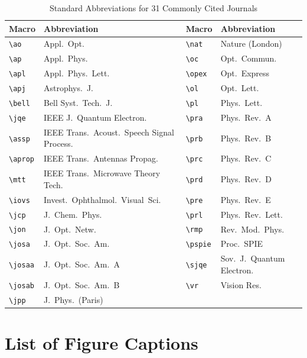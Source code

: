 \documentclass[letterpaper,12pt]{article}   %
\begin{document}
\newpage

\begin{table}[h]
{\bf \caption{Standard Abbreviations for 31 Commonly Cited
Journals}}\begin{center}
\begin{tabular}{lp{2.3in}lp{1.5in}}\hline
Macro & Abbreviation & Macro & Abbreviation \\ \hline
\verb+\ao+ & Appl.\  Opt.\  & \verb+\nat+ & Nature (London)   \\
\verb+\ap+ & Appl.\  Phys.\  & \verb+\oc+ & Opt.\ Commun.\   \\
\verb+\apl+ & Appl.\ Phys.\ Lett.\
  & \verb+\opex+ & Opt.\ Express   \\
\verb+\apj+ & Astrophys.\ J.\  & \verb+\ol+ & Opt.\ Lett.\   \\
\verb+\bell+ & Bell Syst.\ Tech.\ J.\
  & \verb+\pl+ & Phys.\ Lett.\   \\
\verb+\jqe+ & IEEE J.\ Quantum Electron.\
  & \verb+\pra+ & Phys.\ Rev.\ A   \\
\verb+\assp+ & IEEE Trans.\ Acoust.\ Speech Signal Process.\
  & \verb+\prb+ & Phys.\ Rev.\ B   \\
\verb+\aprop+ & IEEE Trans.\  Antennas Propag.\
  & \verb+\prc+ & Phys.\ Rev.\ C   \\
\verb+\mtt+ & IEEE Trans.\ Microwave Theory Tech.\
  & \verb+\prd+ & Phys.\ Rev.\ D   \\
\verb+\iovs+ & Invest.\ Ophthalmol.\ Visual\ Sci.\
  & \verb+\pre+ & Phys.\ Rev.\ E   \\
\verb+\jcp+ & J.\ Chem.\ Phys.\
  & \verb+\prl+ & Phys.\ Rev.\ Lett.\   \\
 \verb+\jon+ & J.\ Opt.\ Netw.\
& \verb+\rmp+ & Rev.\ Mod.\ Phys.\   \\
\verb+\josa+ & J.\ Opt.\ Soc.\ Am.\
& \verb+\pspie+ & Proc.\ SPIE   \\
\verb+\josaa+ & J.\ Opt.\ Soc.\ Am.\ A
  & \verb+\sjqe+ & Sov.\ J.\ Quantum Electron.\   \\
\verb+\josab+ & J.\ Opt.\ Soc.\ Am.\ B
  & \verb+\vr+ & Vision Res.\   \\
\verb+\jpp+ & J.\ Phys.\ (Paris)  & &  \\ \hline
\end{tabular}
\end{center}
\end{table}

\newpage

\section*{List of Figure Captions}
\end{document}
